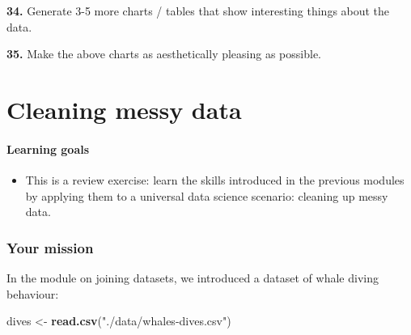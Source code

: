 \documentclass[
]{book}
\newenvironment{Shaded}{\begin{snugshade}}{\end{snugshade}}
\newcommand{\KeywordTok}[1]{\textcolor[rgb]{0.13,0.29,0.53}{\textbf{#1}}}
\newcommand{\NormalTok}[1]{#1}
\newcommand{\StringTok}[1]{\textcolor[rgb]{0.31,0.60,0.02}{#1}}
\providecommand{\tightlist}{%
  \setlength{\itemsep}{0pt}\setlength{\parskip}{0pt}}
\begin{document}
\textbf{34.} Generate 3-5 more charts / tables that show interesting things about the data.

\textbf{35.} Make the above charts as aesthetically pleasing as possible.

\hypertarget{cleaning-messy-data}{%
\chapter{Cleaning messy data}\label{cleaning-messy-data}}

\hypertarget{learning-goals-13}{%
\subsubsection*{Learning goals}\label{learning-goals-13}}

\begin{itemize}
\tightlist
\item
  This is a review exercise: learn the skills introduced in the previous modules by applying them to a universal data science scenario: cleaning up messy data.
\end{itemize}

\hypertarget{your-mission}{%
\subsection*{Your mission}\label{your-mission}}

In the module on joining datasets, we introduced a dataset of whale diving behaviour:

\begin{Shaded}
\begin{Highlighting}[]
\NormalTok{dives <-}\StringTok{ }\KeywordTok{read.csv}\NormalTok{(}\StringTok{"./data/whales-dives.csv"}\NormalTok{)}
\end{Highlighting}
\end{Shaded}
\end{document}
